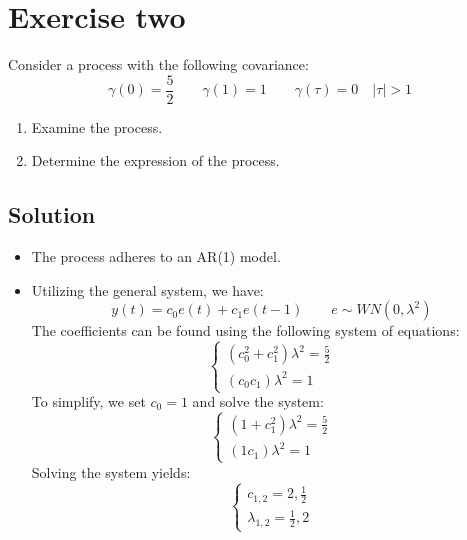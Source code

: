 \section{Exercise two}

Consider a process with the following covariance:
\[\gamma(0)=\dfrac{5}{2}\qquad\gamma(1)=1\qquad\gamma(\tau)=0 \quad \left\lvert \tau \right\rvert > 1\]
\begin{enumerate}
    \item Examine the process.
    \item Determine the expression of the process.
\end{enumerate}

\subsection*{Solution}
\begin{itemize}
    \item The process adheres to an AR(1) model.
    \item Utilizing the general system, we have:
        \[y(t)=c_0e(t)+c_1e(t-1)\qquad e\sim WN(0,\lambda^2)\]
        The coefficients can be found using the following system of equations:
        \[\begin{cases}
            \left(c_0^2+c_1^2\right)\lambda^2 = \frac{5}{2} \\
            \left(c_0c_1\right)\lambda^2= 1
        \end{cases}\]
        To simplify, we set $c_0=1$ and solve the system:
        \[\begin{cases}
            \left(1+c_1^2\right)\lambda^2 = \frac{5}{2} \\
            \left(1c_1\right)\lambda^2= 1
        \end{cases}\]
        Solving the system yields:
        \[\begin{cases}
            c_{1,2} = 2, \frac{1}{2} \\
            \lambda_{1,2} = \frac{1}{2}, 2
        \end{cases}\]
\end{itemize}